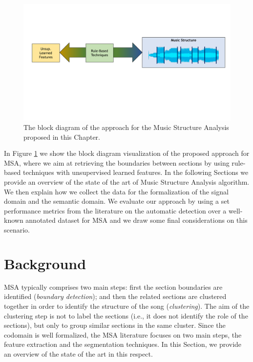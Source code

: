  \begin{figure}[tb]
    \begin{center}
      \includegraphics[trim=1.4cm 8.6cm 0.9cm 5cm,clip=true,width=\textwidth]{img/MSA/schema}
    \end{center}
  \caption{The block diagram of the approach for the Music Structure Analysis proposed in this Chapter.}
  \label{fig:MSA:scheme}
  \end{figure}

In Figure \ref{fig:MSA:scheme} we show the block diagram visualization of the proposed approach for MSA, where we aim at retrieving the boundaries between sections by using rule-based techniques with unsupervised learned features. In the following Sections we provide an overview of the state of the art of Music Structure Analysis algorithm. We then explain how we collect the data for the formalization of the signal domain and the semantic domain. We evaluate our approach by using a set performance metrics from the literature on the automatic detection over a well-known annotated dataset for MSA and we draw some final considerations on this scenario. 

\section{Background}
\label{sec:MSA:intro}
MSA typically comprises two main steps: first the section boundaries are identified (\textit{boundary detection}); and then the related sections are clustered together in order to identify the structure of the song (\textit{clustering}). The aim of the clustering step is not to label the sections (i.e., it does not identify the role of the sections), but only to group similar sections in the same cluster. 
Since the codomain is well formalized, the MSA literature focuses on two main steps, the feature extraction and the segmentation techniques. In this Section, we provide an overview of the state of the art in this respect. 

